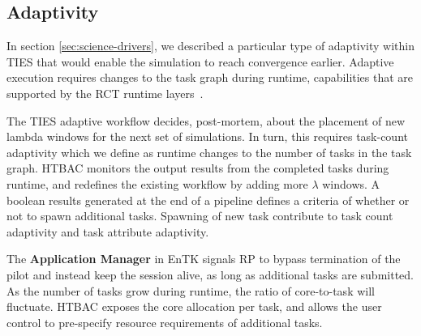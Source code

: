 

\subsection{Adaptivity}

In section \ref{sec:science-drivers}, we described a particular type of
adaptivity within TIES that would enable the simulation to reach
convergence earlier. Adaptive execution requires changes to the task graph 
during runtime, capabilities that are supported by the RCT runtime 
layers~\cite{power-of-many17}.

The TIES adaptive workflow decides, post-mortem, about the placement
of new lambda windows for the next set of simulations. In turn, this requires 
task-count adaptivity which we define as runtime changes to the number of tasks 
in the task graph. HTBAC monitors the output results from the completed tasks
during runtime, and redefines the existing workflow by adding more $\lambda$
windows. A boolean results generated at the end of a pipeline defines a criteria
of whether or not to spawn additional tasks. Spawning of new task contribute
to task count adaptivity and task attribute adaptivity. 

The \textbf{Application
Manager} in EnTK signals RP to bypass termination of the pilot and instead
keep the session alive, as long as additional tasks are submitted. As the
number of tasks grow during runtime, the ratio of core-to-task will fluctuate.
HTBAC exposes the core allocation per task, and allows the user control to
pre-specify resource requirements of additional tasks.




